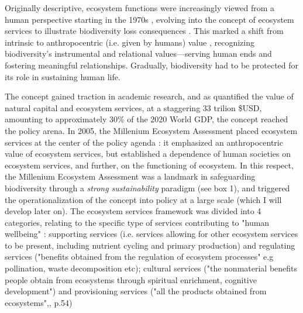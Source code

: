 Originally descriptive, ecosystem functions were increasingly viewed from a human perspective starting in the 1970s \citep{hueting1969functions, schumacher1973small}, evolving into the concept of ecosystem services \citep{ehrlich1981extinction} to illustrate biodiversity loss consequences \citep{gomez_history_2010}. This marked a shift from intrinsic to anthropocentric (i.e. given by humans) value \citep{mouysset_diversity_2023}, recognizing biodiversity’s instrumental and relational values—serving human ends and fostering meaningful relationships. Gradually, biodiversity had to be protected for its role in sustaining human life.



The concept gained traction in academic research, and as \cite{Costanza1997} quantified the value of natural capital and ecosystem services, at a staggering 33 trilion \$USD, amounting to approximately 30\% of the 2020 World GDP, the concept reached the policy arena. In 2005, the Millenium Ecosystem Assessment \citep{MEA2005} placed ecosystem services at the center of the policy agenda : it emphasized an anthropocentric value of ecosystem services, but established a dependence of human societies on ecosystem services, and further, on the functioning of ecosystem. In this respect, the Millenium Ecosystem Assessment \cite{MEA2005} was a landmark in safeguarding biodiversity through a \textit{strong sustainability} paradigm (see box 1), and triggered the operationalization of the concept into policy at a large scale (which I will develop later on). The ecosystem services framework was divided into 4 categories, relating to the specific type of services contributing to "human wellbeing" : supporting services (i.e. services allowing for other ecosystem services to be present, including nutrient cycling and primary production) and regulating services ("benefits obtained from the regulation of ecosystem processes" e.g pollination, waste decomposition etc); cultural services ("the nonmaterial benefits people obtain from ecosystems through spiritual enrichment, cognitive development") and provisioning services ("all the products obtained from ecosystems",\cite{MEA2005}, p.54)

